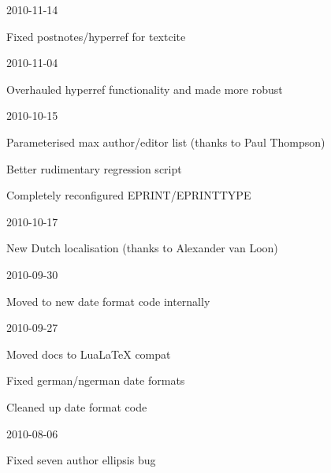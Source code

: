 \documentclass{ltxdockit}
\begin{document}
\begin{changelog}
\begin{release}{2.4}{2010-11-14}
\item Fixed postnotes/hyperref for textcite
\end{release}

\begin{release}{2.3}{2010-11-04}
\item Overhauled hyperref functionality and made more robust
\end{release}

\begin{release}{2.2}{2010-10-15}
\item Parameterised max author/editor list (thanks to Paul Thompson)
\item Better rudimentary regression script
\item Completely reconfigured EPRINT/EPRINTTYPE
\end{release}

\begin{release}{2.1}{2010-10-17}
\item New Dutch localisation (thanks to Alexander van Loon)
\end{release}

\begin{release}{2.0}{2010-09-30}
\item Moved to new date format code internally
\end{release}

\begin{release}{1.9}{2010-09-27}
\item Moved docs to LuaLaTeX compat
\item Fixed german/ngerman date formats
\item Cleaned up date format code
\end{release}

\begin{release}{1.8}{2010-08-06}
\item Fixed seven author ellipsis bug
\end{release}




\end{changelog}
\end{document}
